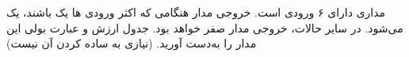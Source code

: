 مداری دارای ۶ ورودی است. خروجی مدار هنگامی که اکثر ورودی ها یک باشند، یک می‌شود. در سایر حالات، خروجی مدار صفر خواهد بود. جدول ارزش و عبارت بولی این مدار را به‌دست آورید. (نیازی به ساده کردن آن نیست)

